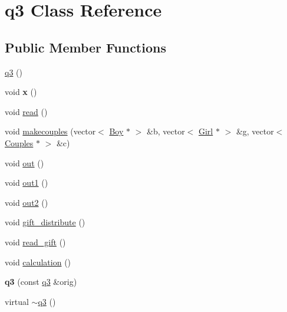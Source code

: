 \hypertarget{classq3}{\section{q3 Class Reference}
\label{classq3}
}
\subsection*{Public Member Functions}
\begin{DoxyCompactItemize}
\item 
\hyperlink{classq3_a0b01592730cb6c887007ed72d3a43d76}{q3} ()
\item 
\hypertarget{classq3_acb32ddf251cf8e5a4290a7c037e118d8}{void {\bfseries x} ()}\label{classq3_acb32ddf251cf8e5a4290a7c037e118d8}

\item 
void \hyperlink{classq3_afd550c9529fc15aa3b1cd4aa16ec36d2}{read} ()
\item 
void \hyperlink{classq3_a73c070e1141dad234776de97e934a398}{makecouples} (vector$<$ \hyperlink{class_boy}{Boy} $\ast$ $>$ \&b, vector$<$ \hyperlink{class_girl}{Girl} $\ast$ $>$ \&g, vector$<$ \hyperlink{class_couples}{Couples} $\ast$ $>$ \&c)
\item 
void \hyperlink{classq3_abdc45b8a32ca20549791df24f8c86f85}{out} ()
\item 
void \hyperlink{classq3_ad4f5f99d6c33c1ebb699884c01d53b0c}{out1} ()
\item 
void \hyperlink{classq3_a5c398e8dd27dca48e1a01fd385092082}{out2} ()
\item 
void \hyperlink{classq3_ab165ca97a76774e618e15a9e0e984964}{gift\-\_\-distribute} ()
\item 
void \hyperlink{classq3_a562a19ed63bd61492a3c49087ee3c646}{read\-\_\-gift} ()
\item 
void \hyperlink{classq3_ab683214c4d51dacef3fd90c3d1a33ffe}{calculation} ()
\item 
\hypertarget{classq3_a5b2618b58b7ff77e591d10e6a4a7d0b2}{{\bfseries q3} (const \hyperlink{classq3}{q3} \&orig)}\label{classq3_a5b2618b58b7ff77e591d10e6a4a7d0b2}

\item 
virtual \hyperlink{classq3_a600cc59a5740f299617fa692685feefb}{$\sim$q3} ()
\end{DoxyCompactItemize}
